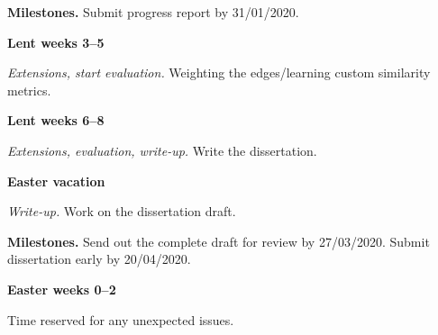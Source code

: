 \documentclass[12pt,a4paper,twoside]{article}
\begin{document}
\textbf{Milestones.} Submit progress report by 31/01/2020.


\textbf{Lent weeks 3–5}

\textit{Extensions, start evaluation.} Weighting the edges/learning custom similarity metrics.

\textbf{Lent weeks 6–8}

\textit{Extensions, evaluation, write-up.} Write the dissertation.

\textbf{Easter vacation}

\textit{Write-up.} Work on the dissertation draft.

\textbf{Milestones.} Send out the complete draft for review by 27/03/2020. Submit dissertation early by 20/04/2020.

\textbf{Easter weeks 0–2}

 Time reserved for any unexpected issues.



\end{document}
